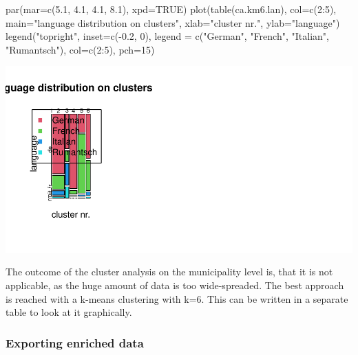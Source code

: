 \documentclass[
]{article}
\newenvironment{Shaded}{\begin{snugshade}}{\end{snugshade}}
\newcommand{\AttributeTok}[1]{\textcolor[rgb]{0.77,0.63,0.00}{#1}}
\newcommand{\ConstantTok}[1]{\textcolor[rgb]{0.00,0.00,0.00}{#1}}
\newcommand{\DecValTok}[1]{\textcolor[rgb]{0.00,0.00,0.81}{#1}}
\newcommand{\FloatTok}[1]{\textcolor[rgb]{0.00,0.00,0.81}{#1}}
\newcommand{\FunctionTok}[1]{\textcolor[rgb]{0.00,0.00,0.00}{#1}}
\newcommand{\NormalTok}[1]{#1}
\newcommand{\SpecialCharTok}[1]{\textcolor[rgb]{0.00,0.00,0.00}{#1}}
\newcommand{\StringTok}[1]{\textcolor[rgb]{0.31,0.60,0.02}{#1}}
\begin{document}
\begin{Shaded}
\begin{Highlighting}[]
\FunctionTok{par}\NormalTok{(}\AttributeTok{mar=}\FunctionTok{c}\NormalTok{(}\FloatTok{5.1}\NormalTok{, }\FloatTok{4.1}\NormalTok{, }\FloatTok{4.1}\NormalTok{, }\FloatTok{8.1}\NormalTok{), }\AttributeTok{xpd=}\ConstantTok{TRUE}\NormalTok{)}
\FunctionTok{plot}\NormalTok{(}\FunctionTok{table}\NormalTok{(ca.km6.lan), }\AttributeTok{col=}\FunctionTok{c}\NormalTok{(}\DecValTok{2}\SpecialCharTok{:}\DecValTok{5}\NormalTok{), }\AttributeTok{main=}\StringTok{"language distribution on clusters"}\NormalTok{, }\AttributeTok{xlab=}\StringTok{"cluster nr."}\NormalTok{, }\AttributeTok{ylab=}\StringTok{"language"}\NormalTok{)}
\FunctionTok{legend}\NormalTok{(}\StringTok{"topright"}\NormalTok{, }\AttributeTok{inset=}\FunctionTok{c}\NormalTok{(}\SpecialCharTok{{-}}\FloatTok{0.2}\NormalTok{, }\DecValTok{0}\NormalTok{), }\AttributeTok{legend =} \FunctionTok{c}\NormalTok{(}\StringTok{"German"}\NormalTok{, }\StringTok{"French"}\NormalTok{, }\StringTok{"Italian"}\NormalTok{, }\StringTok{"Rumantsch"}\NormalTok{), }\AttributeTok{col=}\FunctionTok{c}\NormalTok{(}\DecValTok{2}\SpecialCharTok{:}\DecValTok{5}\NormalTok{), }\AttributeTok{pch=}\DecValTok{15}\NormalTok{)}
\end{Highlighting}
\end{Shaded}

\includegraphics{Influence_factors_files/figure-latex/3.11_ca_comparison_munic-4.pdf}

The outcome of the cluster analysis on the municipality level is, that
it is not applicable, as the huge amount of data is too wide-spreaded.
The best approach is reached with a k-means clustering with k=6. This
can be written in a separate table to look at it graphically.

\hypertarget{exporting-enriched-data}{%
\subsubsection{Exporting enriched data}\label{exporting-enriched-data}}
\end{document}
